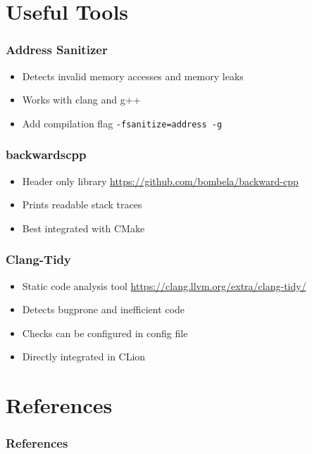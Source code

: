 \documentclass[usenames,dvipsnames,svgnames,table,aspectratio=169]{beamer}
\begin{document}
\section{Useful Tools}
\begin{frame}
    \frametitle{Address Sanitizer}
    \begin{itemize}
        \item<+-> Detects invalid memory accesses and memory leaks
        \item<+-> Works with clang and g++
        \item<+-> Add compilation flag \lstinline{-fsanitize=address -g}
    \end{itemize}
\end{frame}

\begin{frame}
    \frametitle{backwardscpp}
    \begin{itemize}
        \item<+-> Header only library \url{https://github.com/bombela/backward-cpp}
        \item<+-> Prints readable stack traces
        \item<+-> Best integrated with CMake
    \end{itemize}
\end{frame}

\begin{frame}
    \frametitle{Clang-Tidy}
    \begin{itemize}
        \item<+-> Static code analysis tool \url{https://clang.llvm.org/extra/clang-tidy/}
        \item<+-> Detects bugprone and inefficient code
        \item<+-> Checks can be configured in config file
        \item<+-> Directly integrated in CLion
    \end{itemize}
\end{frame}

\section*{References}
\begin{frame}
  \frametitle{References}
  \printbibliography
\end{frame}
\end{document}
